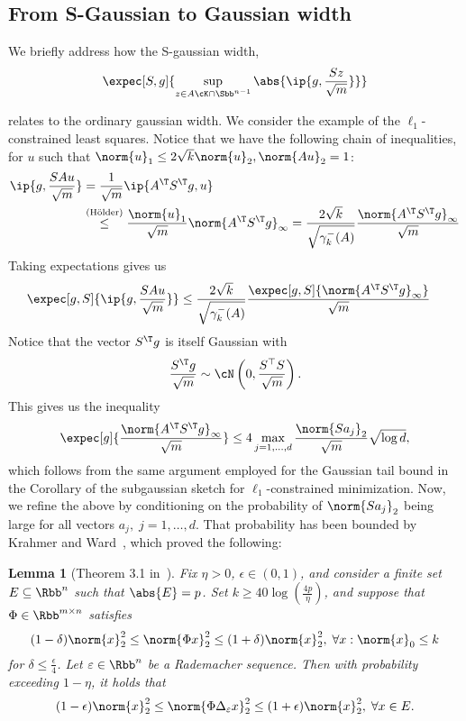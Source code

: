\documentclass[a4paper]{article}
\newtheorem{lemma}{Lemma}
\begin{document}
\subsection*{From S-Gaussian to Gaussian width}
We briefly address how the S-gaussian width,
\[
	\expec[S, g]{\sup_{z \in A \cK \cap \Sbb^{n-1}}
		\abs{\ip{g, \frac{Sz}{\sqrt{m}}}}}
\]

relates to the ordinary gaussian width. We consider the example of the
$\ell_1$-constrained least squares. Notice that we have the following chain of
inequalities, for $u$ such that $\norm{u}_1 \leq 2 \sqrt{k} \norm{u}_2,
\norm{Au}_2 = 1$:
\begin{align*}
	\ip{g, \frac{S A u}{\sqrt{m}}} &= \frac{1}{\sqrt{m}}\ip{A^\T S^\T g, u} \\
		&\overset{(\text{H{\"o}lder})}{\leq} \frac{\norm{u}_1}{\sqrt{m}}
		 \norm{A^\T S^\T g}_{\infty} = \frac{2 \sqrt{k}}{\sqrt{\gamma_k^-(A)}}
		 \frac{\norm{A^\T S^\T g}_{\infty}}{\sqrt{m}}
\end{align*}
Taking expectations gives us
\begin{align*}
	\expec[g, S]{\ip{g, \frac{S A u}{\sqrt{m}}}} &\leq
	\frac{2 \sqrt{k}}{\sqrt{\gamma_k^-(A)}}
	\frac{\expec[g, S]{\norm{A^\T S^\T g}_{\infty}}}{\sqrt{m}}
\end{align*}
Notice that the vector $S^\T g$ is itself Gaussian with
\[
	\frac{S^\T g}{\sqrt{m}} \sim \cN\left(0, \frac{S^\top S}{\sqrt{m}} \right).
\]
This gives us the inequality
\[
	\expec[g]{\frac{\norm{A^\T S^\T g}_{\infty}}{\sqrt{m}}}
	\leq 4 \max_{j=1, \dots, d} \frac{\norm{S a_j}_2}{\sqrt{m}}
		\sqrt{\log d},
\]
which follows from the same argument employed for the Gaussian tail bound in
the Corollary of the subgaussian sketch for $\ell_1$-constrained minimization.
Now, we refine the above by conditioning on the probability of $\norm{S a_j}_2$
being large for all vectors $a_j, \; j = 1, \dots, d$.
That probability has been bounded by Krahmer and Ward~\cite{KraWard11}, which
proved the following:
\begin{lemma}[Theorem 3.1 in~\cite{KraWard11}]
	\label{lemma:JL_embedding_rademacher}
	Fix $\eta > 0$, $\epsilon \in (0, 1)$, and consider a finite set $E
	\subseteq \Rbb^n$ such that $\abs{E} = p$. Set $k \geq 40
	\log\left(\frac{4p}{\eta}\right)$, and suppose that $\Phi \in \Rbb^{m \times
	n}$ satisfies
	\[
		(1 - \delta) \norm{x}_2^2 \leq \norm{\Phi x}_2^2 \leq
		(1 + \delta) \norm{x}_2^2, \; \forall x : \norm{x}_0 \leq k
	\]
	for $\delta \leq \frac{\epsilon}{4}$. Let $\varepsilon \in \Rbb^n$ be a
		Rademacher sequence. Then with probability exceeding $1 - \eta$, it
		holds that
	\[
		(1 - \epsilon) \norm{x}_2^2 \leq
		\norm{\Phi \Delta_{\varepsilon} x}_2^2 \leq
		(1 + \epsilon) \norm{x}_2^2, \;
		\forall x \in E.
	\]
\end{lemma}
\end{document}

